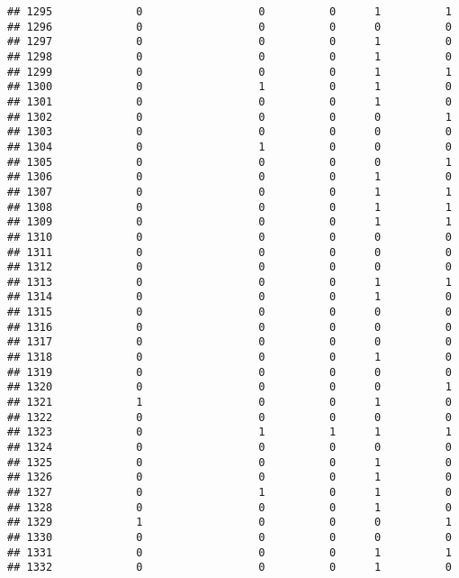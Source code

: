 \documentclass[
]{article}
\begin{document}
\begin{verbatim}
## 1295             0                  0          0      1          1
## 1296             0                  0          0      0          0
## 1297             0                  0          0      1          0
## 1298             0                  0          0      1          0
## 1299             0                  0          0      1          1
## 1300             0                  1          0      1          0
## 1301             0                  0          0      1          0
## 1302             0                  0          0      0          1
## 1303             0                  0          0      0          0
## 1304             0                  1          0      0          0
## 1305             0                  0          0      0          1
## 1306             0                  0          0      1          0
## 1307             0                  0          0      1          1
## 1308             0                  0          0      1          1
## 1309             0                  0          0      1          1
## 1310             0                  0          0      0          0
## 1311             0                  0          0      0          0
## 1312             0                  0          0      0          0
## 1313             0                  0          0      1          1
## 1314             0                  0          0      1          0
## 1315             0                  0          0      0          0
## 1316             0                  0          0      0          0
## 1317             0                  0          0      0          0
## 1318             0                  0          0      1          0
## 1319             0                  0          0      0          0
## 1320             0                  0          0      0          1
## 1321             1                  0          0      1          0
## 1322             0                  0          0      0          0
## 1323             0                  1          1      1          1
## 1324             0                  0          0      0          0
## 1325             0                  0          0      1          0
## 1326             0                  0          0      1          0
## 1327             0                  1          0      1          0
## 1328             0                  0          0      1          0
## 1329             1                  0          0      0          1
## 1330             0                  0          0      0          0
## 1331             0                  0          0      1          1
## 1332             0                  0          0      1          0

\end{verbatim}
\end{document}
